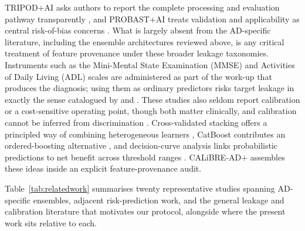 \documentclass[conference]{IEEEtran}
\begin{document}
TRIPOD+AI asks authors to report the complete processing and evaluation pathway transparently \cite{b34}, and PROBAST+AI treats validation and applicability as central risk-of-bias concerns \cite{b35}. What is largely absent from the AD-specific literature, including the ensemble architectures reviewed above, is any critical treatment of feature provenance under these broader leakage taxonomies. Instruments such as the Mini-Mental State Examination (MMSE) and Activities of Daily Living (ADL) scales are administered as part of the work-up that produces the diagnosis; using them as ordinary predictors risks target leakage in exactly the sense catalogued by \cite{b40} and \cite{b41}. These studies also seldom report calibration or a cost-sensitive operating point, though both matter clinically, and calibration cannot be inferred from discrimination \cite{b32}. Cross-validated stacking offers a principled way of combining heterogeneous learners \cite{b31}, CatBoost contributes an ordered-boosting alternative \cite{b19}, and decision-curve analysis links probabilistic predictions to net benefit across threshold ranges \cite{b33}. CALiBRE-AD+ assembles these ideas inside an explicit feature-provenance audit.

Table~\ref{tab:relatedwork} summarises twenty representative studies spanning AD-specific ensembles, adjacent risk-prediction work, and the general leakage and calibration literature that motivates our protocol, alongside where the present work sits relative to each.
\end{document}
